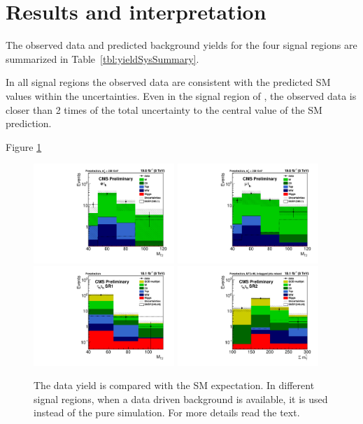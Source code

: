 \section{Results and interpretation}
\label{sect:stat}
The observed data and predicted background yields for the four signal regions are summarized in Table~\ref{tbl:yieldSysSummary}. 

In all signal regions the observed data  are consistent with the predicted SM values within the uncertainties. 
Even in the signal region of \tauTau \bintwo, the observed data is closer than 2 times of the total uncertainty to the central 
value of the SM prediction.

Figure \ref{fig:yield_final}
\begin{figure}[!htb]
\centering
\includegraphics[width=0.475\textwidth,keepaspectratio=true]{StatisticsFig/MT2_tauMTgt200_DDFakeEleTau.pdf}
\includegraphics[width=0.475\textwidth,keepaspectratio=true]{StatisticsFig/MT2muTau_tauMTgt200_DDFake.pdf}
\includegraphics[width=0.475\textwidth,keepaspectratio=true]{StatisticsFig/QCDWestimation_bin1.pdf}
\includegraphics[width=0.475\textwidth,keepaspectratio=true]{StatisticsFig/QCDWestimation_bin2.pdf}
\caption{The data yield is compared with the SM expectation. In different signal regions, 
when a data driven background is available, it is used instead of the pure simulation. For more details read the text.}
\label{fig:yield_final}
\end{figure}

